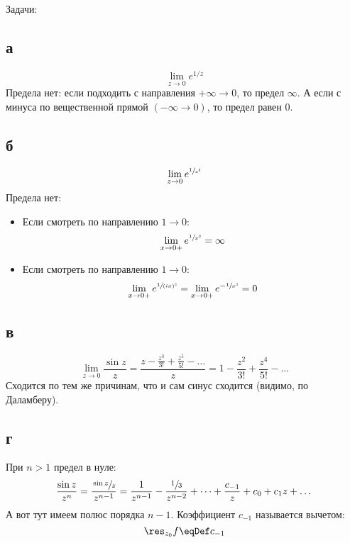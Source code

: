 	Задачи:
	\subsection{а}
		\[
			\lim_{z\to 0} e^{1/z}
		\]
		Предела нет: если подходить с направления $+\infty \to 0$, то предел $\infty$.
		А если с минуса по вещественной прямой $(-\infty \to 0)$, то предел равен $0$.

	\subsection{б}
		\[
			\lim_{z\to 0} e^{\sfrac{1}{z^2}}
		\]
		Предела нет:
		\begin{itemize}
			\item
				Если смотреть по направлению $1 \to 0$:
				\[ \lim_{x\to 0+} e^{\sfrac{1}{x^2}} = \infty \]
			\item
				Если смотреть по направлению $1 \to 0$:
				\[ \lim_{x\to 0+} e^{\sfrac{1}{(ix)^2}} = \lim_{x\to 0+} e^{-\sfrac{1}{x^2}} = 0\]
		\end{itemize}

	\subsection{в}
		\[
			\lim_{z\to 0} \frac{\sin z}{z} = \frac{z - \frac{z^3}{3!} + \frac{z^5}{5!} - \dots}{z} = 1 - \frac{z^2}{3!} + \frac{z^4}{5!} - \dots
		\]
		Сходится по тем же причинам, что и сам синус сходится (видимо, по Даламберу).

	\subsection{г}
		При $n>1$ предел в нуле:
		\[
			\frac{\sin z}{z^n} = \frac{\sfrac{\sin z}{z}}{z^{n-1}} = \frac{1}{z^{n-1}} - \frac{\sfrac{1}{3}}{z^{n-2}} + \dots + \frac{c_{-1}}{z} + c_0 + c_1z + \dots
		\]
		А вот тут имеем полюс порядка $n-1$.
		Коэффициент $c_{-1}$ называется вычетом:
		\[
			\res_{z_0} f \eqDef c_{-1}
		\]

